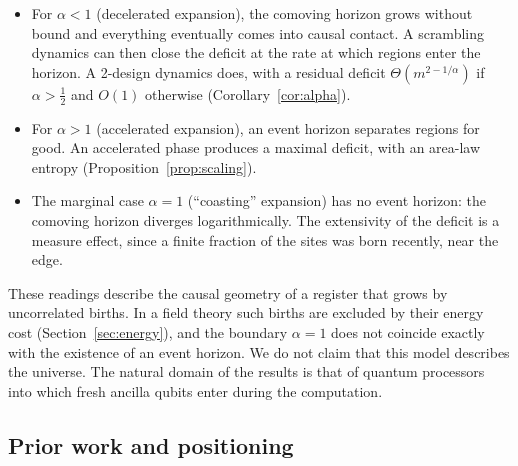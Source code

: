 \begin{itemize}[leftmargin=*,itemsep=1pt]
\item For $\alpha<1$ (decelerated expansion), the comoving horizon grows without bound and everything eventually comes into causal contact. A scrambling dynamics can then close the deficit at the rate at which regions enter the horizon. A 2-design dynamics does, with a residual deficit $\Theta(m^{2-1/\alpha})$ if $\alpha>\frac12$ and $O(1)$ otherwise (Corollary~\ref{cor:alpha}).
\item For $\alpha>1$ (accelerated expansion), an event horizon separates regions for good. An accelerated phase produces a maximal deficit, with an area-law entropy (Proposition~\ref{prop:scaling}).
\item The marginal case $\alpha=1$ (``coasting'' expansion) has no event horizon: the comoving horizon diverges logarithmically. The extensivity of the deficit is a measure effect, since a finite fraction of the sites was born recently, near the edge.
\end{itemize}
These readings describe the causal geometry of a register that grows by uncorrelated births. In a field theory such births are excluded by their energy cost (Section~\ref{sec:energy}), and the boundary $\alpha=1$ does not coincide exactly with the existence of an event horizon. We do not claim that this model describes the universe. The natural domain of the results is that of quantum processors into which fresh ancilla qubits enter during the computation.

\subsection{Prior work and positioning}\label{sec:prior}

